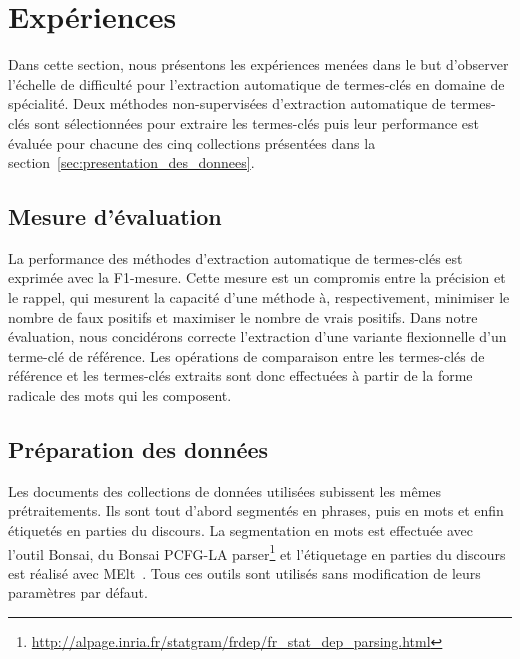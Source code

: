 \section{Expériences}
\label{sec:experiences}
  Dans cette section, nous présentons les expériences menées dans le but
  d'observer l'échelle de difficulté pour l'extraction automatique de
  termes-clés en domaine de spécialité. Deux méthodes non-supervisées
  d'extraction automatique de termes-clés sont sélectionnées pour extraire les
  termes-clés puis leur performance est évaluée pour chacune des cinq
  collections présentées dans la section~\ref{sec:presentation_des_donnees}.

  \subsection{Mesure d'évaluation}
  \label{subsec:mesure_d_evaluation}
    La performance des méthodes d'extraction automatique de termes-clés est
    exprimée avec la F1-mesure. Cette mesure est un compromis entre la précision
    et le rappel, qui mesurent la capacité d'une méthode à, respectivement,
    minimiser le nombre de faux positifs et maximiser le nombre de vrais
    positifs. Dans notre évaluation, nous concidérons correcte l'extraction
    d'une variante flexionnelle d'un terme-clé de référence. Les opérations de
    comparaison entre les termes-clés de référence et les termes-clés extraits
    sont donc effectuées à partir de la forme radicale des mots qui les
    composent.

  \subsection{Préparation des données}
  \label{subsec:preparation_des_donnees}
    Les documents des collections de données utilisées subissent les mêmes
    prétraitements. Ils sont tout d'abord segmentés en phrases, puis en mots et
    enfin étiquetés en parties du discours. La segmentation en mots est
    effectuée avec l'outil Bonsai, du Bonsai PCFG-LA
    parser\footnote{\url{http://alpage.inria.fr/statgram/frdep/fr_stat_dep_parsing.html}}
    et l'étiquetage en parties du discours est réalisé avec
    MElt~\cite{denis2009melt}. Tous ces outils sont utilisés sans modification
    de leurs paramètres par défaut.

